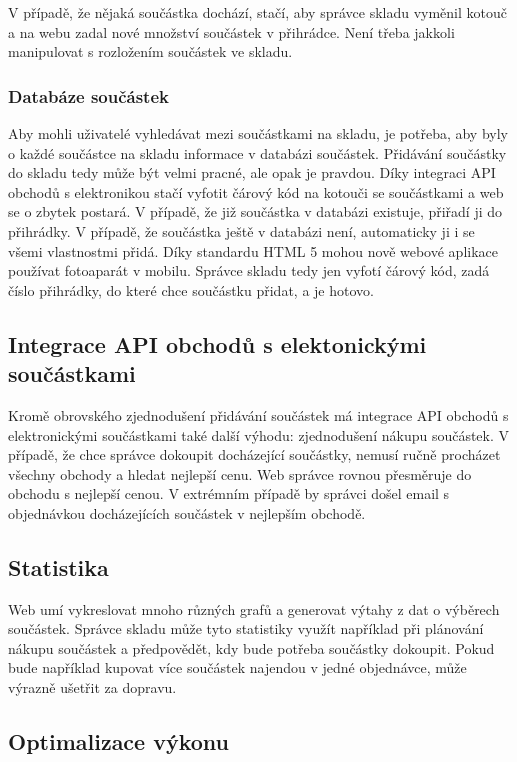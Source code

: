 \documentclass[12pt, a4paper, oneside]{article}
\begin{document}
V případě, že nějaká součástka dochází, stačí, aby správce skladu vyměnil kotouč a na webu zadal nové množství součástek v přihrádce. Není třeba jakkoli manipulovat s rozložením součástek ve skladu.


\subsubsection{Databáze součástek}

Aby mohli uživatelé vyhledávat mezi součástkami na skladu, je potřeba, aby byly o každé součástce na skladu informace v databázi součástek. Přidávání součástky do skladu tedy může být velmi pracné, ale opak je pravdou. Díky integraci API obchodů s elektronikou stačí vyfotit čárový kód na kotouči se součástkami a web se o zbytek postará. V případě, že již součástka v databázi existuje, přiřadí ji do přihrádky. V případě, že součástka ještě v databázi není, automaticky ji i se všemi vlastnostmi přidá. Díky standardu HTML 5 mohou nově webové aplikace používat fotoaparát v mobilu. Správce skladu tedy jen vyfotí čárový kód, zadá číslo přihrádky, do které chce součástku přidat, a je hotovo.

\subsection{Integrace API obchodů s elektonickými součástkami}

Kromě obrovského zjednodušení přidávání součástek má integrace API obchodů s elektronickými součástkami také další výhodu: zjednodušení nákupu součástek. V případě, že chce správce dokoupit docházející součástky, nemusí ručně procházet všechny obchody a hledat nejlepší cenu. Web správce rovnou přesměruje do obchodu s nejlepší cenou. V extrémním případě by správci došel email s objednávkou docházejících součástek v nejlepším obchodě.

\subsection{Statistika}

Web umí vykreslovat mnoho různých grafů a generovat výtahy z dat o výběrech součástek. Správce skladu může tyto statistiky využít například při plánování nákupu součástek a předpovědět, kdy bude potřeba součástky dokoupit. Pokud bude například kupovat více součástek najendou v jedné objednávce, může výrazně ušetřit za dopravu.

\subsection{Optimalizace výkonu}
\end{document}
